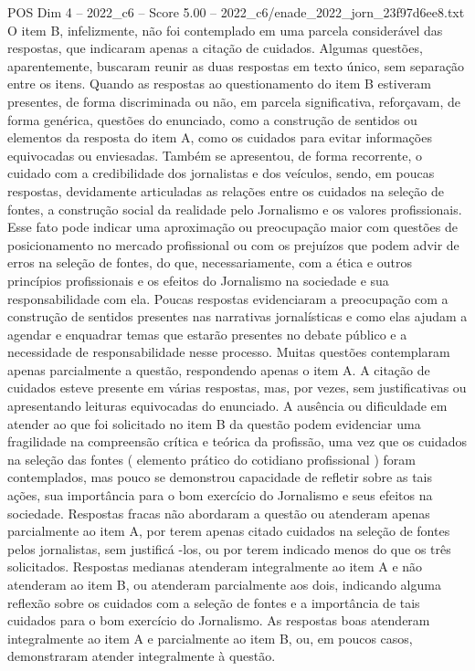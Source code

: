 \begin{textsample}{POS Dim 4 – 2022\_c6 – Score 5.00 – 2022\_c6/enade\_2022\_jorn\_23f97d6ee8.txt}
O item B, infelizmente, não foi contemplado em uma parcela considerável das respostas, que indicaram apenas a citação de cuidados.
Algumas questões, aparentemente, buscaram reunir as duas respostas em texto único, sem separação entre os itens.
Quando as respostas ao questionamento do item B estiveram presentes, de forma discriminada ou não, em parcela significativa, reforçavam, de forma genérica, questões do enunciado, como a construção de sentidos ou elementos da resposta do item A, como os cuidados para evitar informações equivocadas ou enviesadas.
Também se apresentou, de forma recorrente, o cuidado com a credibilidade dos jornalistas e dos veículos, sendo, em poucas respostas, devidamente articuladas as relações entre os cuidados na seleção de fontes, a construção social da realidade pelo Jornalismo e os valores profissionais.
Esse fato pode indicar uma aproximação ou preocupação maior com questões de posicionamento no mercado profissional ou com os prejuízos que podem advir de erros na seleção de fontes, do que, necessariamente, com a ética e outros princípios profissionais e os efeitos do Jornalismo na sociedade e sua responsabilidade com ela.
Poucas respostas evidenciaram a preocupação com a construção de sentidos presentes nas narrativas jornalísticas e como elas ajudam a agendar e enquadrar temas que estarão presentes no debate público e a necessidade de responsabilidade nesse processo.
Muitas questões contemplaram apenas parcialmente a questão, respondendo apenas o item A.
A citação de cuidados esteve presente em várias respostas, mas, por vezes, sem justificativas ou apresentando leituras equivocadas do enunciado.
A ausência ou dificuldade em atender ao que foi solicitado no item B da questão podem evidenciar uma fragilidade na compreensão crítica e teórica da profissão, uma vez que os cuidados na seleção das fontes ( elemento prático do cotidiano profissional ) foram contemplados, mas pouco se demonstrou capacidade de refletir sobre as tais ações, sua importância para o bom exercício do Jornalismo e seus efeitos na sociedade.
Respostas fracas não abordaram a questão ou atenderam apenas parcialmente ao item A, por terem apenas citado cuidados na seleção de fontes pelos jornalistas, sem justificá -los, ou por terem indicado menos do que os três solicitados.
Respostas medianas atenderam integralmente ao item A e não atenderam ao item B, ou atenderam parcialmente aos dois, indicando alguma reflexão sobre os cuidados com a seleção de fontes e a importância de tais cuidados para o bom exercício do Jornalismo.
As respostas boas atenderam integralmente ao item A e parcialmente ao item B, ou, em poucos casos, demonstraram atender integralmente à questão.

\end{textsample}
